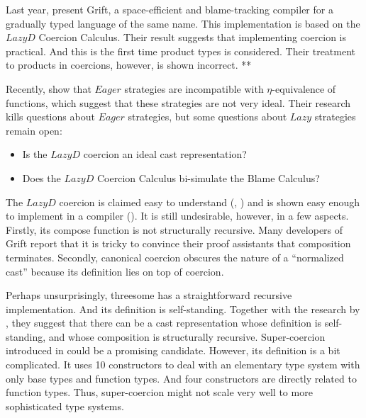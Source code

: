 \documentclass[acmsmall,review,anonymous]{acmart}\settopmatter{printfolios=true,printccs=false,printacmref=false}
\begin{document}
Last year, \citet{kuhlenschmidt2018efficient} present Grift, a space-efficient 
and blame-tracking compiler for a gradually typed language of the same name. 
This implementation is based on the $ Lazy D $ Coercion Calculus.
Their result suggests that implementing coercion is practical. And this is the 
first time product types is considered. Their treatment to products in 
coercions, however, is shown incorrect. **


Recently, \citet{new2019gradual} show that $ Eager $ strategies are 
incompatible with $\eta$-equivalence of functions, which suggest that these 
strategies are not very ideal. Their research kills questions about $ Eager $ 
strategies, but some questions about $ Lazy $ strategies remain open:

\begin{itemize}
	\item Is the $ Lazy D $ coercion an ideal cast representation?
	\item Does the $ Lazy D $ Coercion Calculus bi-simulate the Blame Calculus?
\end{itemize}

The $ Lazy D $ coercion is claimed easy to understand 
(\cite{garcia2013calculating}, \cite{siek2015blame}) and is shown 
easy enough to implement in a compiler (\cite{kuhlenschmidt2018efficient}).
It is still undesirable, however, in a 
few aspects. Firstly, its compose function is not structurally recursive. Many 
developers of Grift report that it is tricky to convince their 
proof assistants that composition terminates. Secondly, canonical coercion
obscures the nature of a ``normalized cast'' because its definition lies on 
top of coercion. 

Perhaps unsurprisingly, threesome has a straightforward recursive 
implementation. And its definition is self-standing. Together with the research 
by \citet{garcia2013calculating}, they suggest that there can be a cast 
representation whose definition is self-standing, and whose composition is 
structurally recursive. Super-coercion introduced in 
\citet{garcia2013calculating} could 
be a promising candidate. However, its definition is a bit complicated. It uses 
10 constructors to deal with an elementary type system with only base types and 
function types. And four constructors are directly related to 
function types. Thus, super-coercion might not scale very well to more 
sophisticated type systems.
\end{document}
